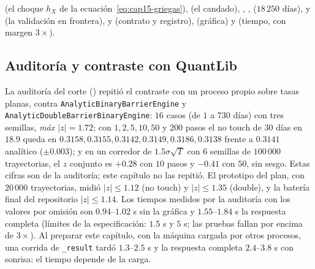 \begin{raggedright}
 (el choque $h_X$ de la ecuación~\eqref{eq:cap15-griegas}),
 (el candado),
,
,
 ($18\,250$ días),
 y
 (la validación en frontera),
 y
 (contrato y registro),
 (gráfica) y
 (tiempo, con margen $3\times$).
\end{raggedright}

\subsection{Auditoría y contraste con QuantLib}\label{sec:cap15-auditoria}

La auditoría del corte () repitió el contraste con un proceso propio sobre tasas
planas, contra \texttt{AnalyticBinaryBarrierEngine} y \texttt{AnalyticDoubleBarrierBinaryEngine}: $16$ casos (de $1$ a $730$ días) con tres semillas,
\emph{máx $|z|=1.72$}; con $1,2,5,10,50$ y $200$ pasos el no touch de $30$ días en $18.9$ queda en
$0.3158,0.3155,0.3142,0.3149,0.3186,0.3138$ frente a $0.3141$ analítico ($\pm0.003$); y en un corredor de $1.5\sigma\sqrt T$ con $6$ semillas de $100\,000$ trayectorias,
el $z$ conjunto es $+0.28$ con $10$ pasos y $-0.41$ con $50$, sin sesgo. Estas cifras son de la
auditoría; este capítulo no las repitió. El prototipo del plan, con $20\,000$ trayectorias, midió $|z|\le1.12$ (no touch) y $|z|\le1.35$ (double), y la batería final del
repositorio $|z|\le1.14$. Los tiempos medidos por la auditoría con los valores por omisión son $0.94$--$1.02$ s sin la gráfica y
$1.55$--$1.84$ s la respuesta completa (límites de la especificación: $1.5$ s y $5$ s; las pruebas fallan por encima de $3\times$). Al
preparar este capítulo, con la máquina cargada por otros procesos, una corrida de \texttt{\_result} tardó $1.3$--$2.5$ s y la respuesta completa $2.4$--$3.8$ s con
sonrisa: el tiempo depende de la carga.


